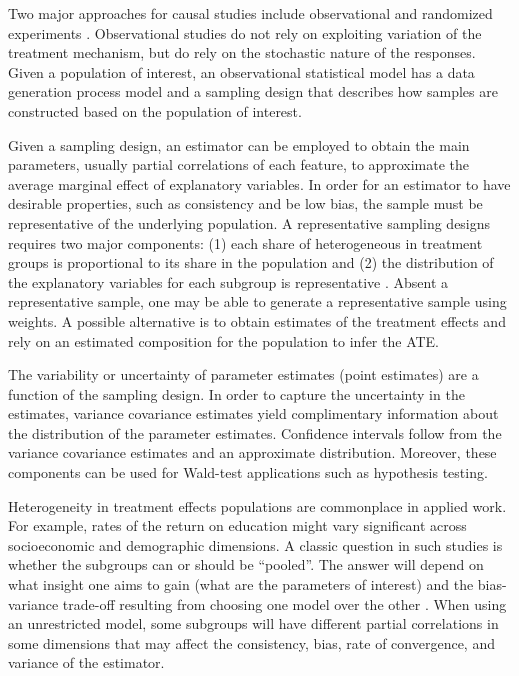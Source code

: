 \documentclass{jbsc}
\begin{document}
Two major approaches for causal studies include observational and randomized experiments \citep{Athey_Imbens_2016}. Observational studies do not rely on exploiting variation of the treatment mechanism, but do rely on the stochastic nature of the responses. Given a population of interest, an observational statistical model has a data generation process model and a sampling design that describes how samples are constructed based on the population of interest.

Given a sampling design, an estimator can be employed to obtain the main parameters, usually partial correlations of each feature, to approximate the average marginal effect of explanatory variables. In order for an estimator to have desirable properties, such as consistency and be low bias, the sample must be representative of the underlying population. A representative sampling designs requires two major components: (1) each share of heterogeneous in treatment groups is proportional to its share in the population and (2) the distribution of the explanatory variables for each subgroup is representative \citep{Solon_Haider_Wooldridge_2015}. Absent a representative sample, one may be able to generate a representative sample using weights. A possible alternative is to obtain estimates of the treatment effects and rely on an estimated composition for the population to infer the ATE.

The variability or uncertainty of parameter estimates (point estimates) are a function of the sampling design. In order to capture the uncertainty in the estimates, variance covariance estimates yield complimentary information about the distribution of the parameter estimates. Confidence intervals follow from the variance covariance estimates and an approximate distribution. Moreover, these components can be used for Wald-test applications such as hypothesis testing.

Heterogeneity in treatment effects populations are commonplace in applied work. For example, rates of the return on education might vary significant across socioeconomic and demographic dimensions. A classic question in such studies is whether the subgroups can or should be ``pooled''. The answer will depend on what insight one aims to gain (what are the parameters of interest) and the bias-variance trade-off resulting from choosing one model over the other \citep{Baltagi_2013}. When using an unrestricted model, some subgroups will have different partial correlations in some dimensions that may affect the consistency, bias, rate of convergence, and variance of the estimator.
\end{document}
